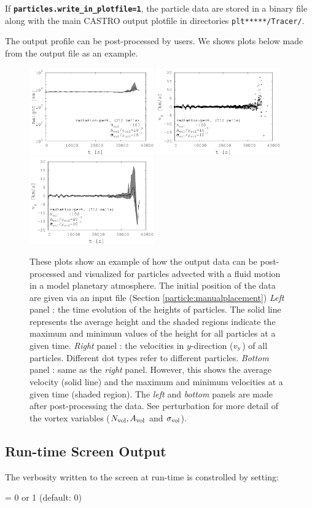 \vspace{0.05in}

\noindent If {\tt {\bf particles.write\_in\_plotfile=1}}, the particle data are stored in a binary file along with the main CASTRO output plotfile in directories {\tt plt*****/Tracer/}. 
\vspace{0.05in}


\noindent The output profile can be post-processed by users. We shows plots below made from the output file as an example.

\begin{figure}[h]
	\centering
	\includegraphics[width=2.1in]{tracerparticleaverage}
	\includegraphics[width=2.1in]{tracerparticleeachvy}
	\includegraphics[width=2.1in]{tracerparticlevyaverage}
	\caption{These plots show an example of how the output data can be post-processed and visualized for particles advected with a fluid motion in a model planetary atmosphere. The initial position of the data are given via an input file (Section \ref{particle:manualplacement}) 
		\textit{Left} panel : the time evolution of the heights of particles. The solid line represents the average height and the shaded regions indicate the maximum and minimum values of the height for all particles at a given time. \textit{Right} panel : the velocities in $y$-direction ($v_{\rm y}$) of all particles. Different dot types refer to different particles. \textit{Bottom} panel : same as the \textit{right} panel. However, this shows the average velocity (solid line) and the maximum and minimum velocities at a given time (shaded region). The \textit{left} and \textit{bottom} panels are made after post-processing the data. See perturbation for more detail of the vortex variables ($N_{\rm vol}, A_{\rm vol}$ and $\sigma_{\rm vol}$).}
\end{figure}


\subsection{Run-time Screen Output}

The verbosity written to the screen at run-time is constrolled by setting:

 = 0 or 1 (default: 0)\\


%